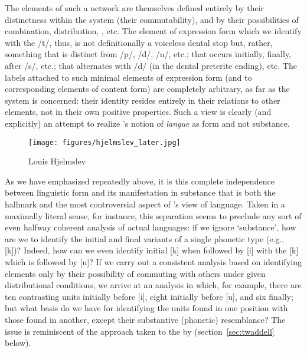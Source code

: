 The elements of such a network are themselves defined entirely by
their distinctness within the system (their commutability), and by
their possibilities of combination, distribution, ,
etc. The element of  expression form which we identify with the
 /t/, thus, is not definitionally a voiceless dental stop but,
rather, something that is distinct from /p/, /d/, /n/, etc.; that
occurs initially, finally, after /s/, etc.; that alternates with /d/
(in the dental preterite ending), etc. The labels attached to such
minimal elements of expression form (and to corresponding elements of
content form) are completely arbitrary, as far as the system is
concerned: their identity resides entirely in their relations to other
elements, not in their own positive properties. Such a view is clearly
(and explicitly) an attempt to realize {\Saussure}'s notion of
\emph{langue} as form and not substance.

\begin{wrapfigure}{r}{.4\textwidth}
  \texttt{[image: figures/hjelmslev\_later.jpg]}
  \caption{Louis Hjelmslev}
  \label{fig:ch.hjelmslev.hjelmslev2}
\end{wrapfigure}
As we have emphasized repeatedly above, it is this complete
independence between linguistic form and its manifestation in
substance that is both the hallmark and the most controversial aspect
of {\Hjelmslev}'s view of language. Taken in a maximally literal sense,
for instance, this separation seems to preclude any sort of even
halfway coherent analysis of actual languages: if we ignore
`substance', how are we to identify the initial and final variants of
a single phonetic type (e.g., [k])? Indeed, how can we even identify
initial [k] when followed by [i] with the [k] which is followed by
[u]? If we carry out a consistent analysis based on identifying
elements only by their possibility of commuting with others under
given distributional conditions, we arrive at an analysis in which,
for example, there are ten contrasting units initially before [i],
eight initially before [u], and six finally; but what basis do we have
for identifying the units found in one position with those found in
another, except their substantive (phonetic) resemblance? The issue is
reminiscent of the approach taken to the  by {\Twaddell}
(section~\ref{sec:twaddell} below).

